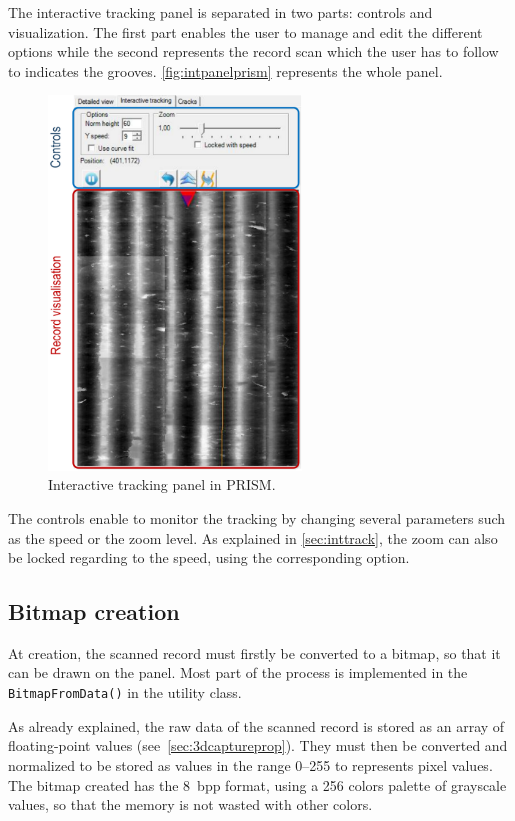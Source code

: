 The interactive tracking panel is separated in two parts: controls and visualization. The first part enables the user to manage and edit the different options while the second represents the record scan which the user has to follow to indicates the grooves. \autoref{fig:intpanelprism} represents the whole panel.

\begin{figure}[!ht]
\centering
\includegraphics[width=0.6\textwidth]{images/int-track-panel-prism}
\caption{Interactive tracking panel in PRISM.}
\label{fig:intpanelprism}
\end{figure}

The controls enable to monitor the tracking by changing several parameters such as the speed or the zoom level. As explained in \autoref{sec:inttrack}, the zoom can also be locked regarding to the speed, using the corresponding option.

\subsection{Bitmap creation}

At creation, the scanned record must firstly be converted to a bitmap, so that it can be drawn on the panel. Most part of the process is implemented in the \texttt{BitmapFromData()} in the utility class.

As already explained, the raw data of the scanned record is stored as an array of floating-point values (see~\autoref{sec:3dcaptureprop}). They must then be converted and normalized to be stored as values in the range \numrange[range-phrase=--]{0}{255} to represents pixel values. The bitmap created has the \SI{8}{bpp} format, using a 256 colors palette of grayscale values, so that the memory is not wasted with other colors.

